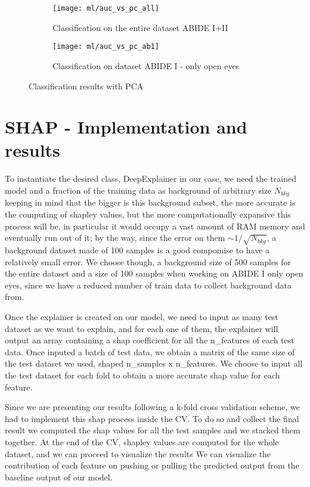\documentclass[a4paper,11pt]{article}
\begin{document}
\begin{figure}
\centering
\begin{subfigure}{0.4\textwidth}
   \texttt{[image: ml/auc\_vs\_pc\_all]}
   \caption{Classification on the entire dataset ABIDE I+II}
   \label{}
\end{subfigure}
\begin{subfigure}{0.4\textwidth}
   \texttt{[image: ml/auc\_vs\_pc\_ab1]}
   \caption{Classification on dataset ABIDE I - only open eyes}
   \label{}
\end{subfigure}
\caption{Classification results with PCA}
\label{fig:classification_pearson_pca}
\end{figure}




\newpage


\section{SHAP - Implementation and results}


To instantiate the desired class, DeepExplainer in our case, we need the trained model and a fraction of the training data as background of arbitrary size $N_{bkg}$ keeping in mind that the bigger is this background subset, the more accurate is the computing of shapley values, but the more computationally expansive this process will be, in particular it would occupy a vast amount of RAM memory and eventually run out of it; by the way, since the error on them $\sim 1/\sqrt{N_{bkg}}$, a background dataset made of 100 samples is a good compomise to have a relatively small error.
We choose though, a background size of 500 samples for the entire dataset and a size of 100 samples when working on ABIDE I only open eyes, since we have a reduced number of train data to collect background data from.

Once the explainer is created on our model, we need to input as many test dataset as we want to explain, and for each one of them, the explainer will output an array containing a shap coefficient for all the n\_features of each test data.
Once inputed a batch of test data, we obtain a matrix of the same size of the test dataset we used, shaped n\_samples x n\_features.
We choose to input all the test dataset for each fold to obtain a more accurate shap value for each feature.

Since we are presenting our results following a k-fold cross validation scheme, we had to implement this shap process inside the CV.
To do so and collect the final result we computed the shap values for all the test samples and we stacked them together.
At the end of the CV, shapley values are computed for the whole dataset, and we can proceed to visualize the results
We can visualize the contribution of each feature on pushing or pulling the predicted output from the baseline output of our model.
\end{document}
